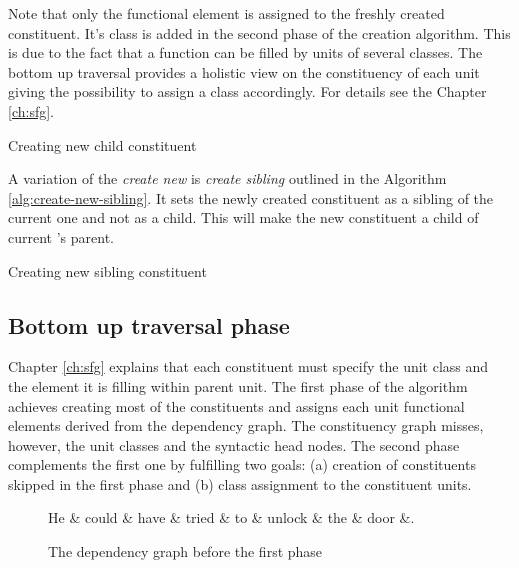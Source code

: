 Note that only the functional element is assigned to the freshly created constituent. It's class is added in the second phase of the creation algorithm. This is due to the fact that a function can be filled by units of several classes. The bottom up traversal provides a holistic view on the constituency of each unit giving the possibility to assign a class accordingly. For details see the Chapter \ref{ch:sfg}.

\begin{algorithm}[!ht]
\Input { \cgPointer, \Children, \elementType, \edge, \dg, \cg}
	\caption{Creating new child constituent}
	\label{alg:create-new}
\end{algorithm}

A variation of the \textit{create new} is \textit{create sibling}  outlined in the Algorithm \ref{alg:create-new-sibling}. It sets the newly created constituent as a sibling of the current one and not as a child. This will make the new constituent a child of current \cgPointer's parent.

\begin{algorithm}[!ht]
	\Input { \cgPointer, \Children, \elementType, \edge, \dg, \cg}
	\caption{Creating new sibling constituent}
	\label{alg:create-new-sibling}
\end{algorithm}

\subsection{Bottom up traversal phase}
Chapter \ref{ch:sfg} explains that each constituent must specify the unit class and the element it is filling within parent unit. The first phase of the algorithm achieves creating most of the constituents and assigns each unit functional elements derived from the dependency graph. The constituency graph misses, however, the unit classes and the syntactic head nodes. The second phase complements the first one by fulfilling two goals: (a) creation of constituents skipped in the first phase and (b) class assignment to the constituent units.
\begin{figure}[!ht]
	\centering
	\begin{dependency}
		\begin{deptext}[]
			He \& could \& have \& tried \& to \& unlock \& the \& door \&. \\
		\end{deptext}
	\end{dependency}
	\caption{The dependency graph before the first phase}
	\label{fig:dep-example1}
\end{figure}

